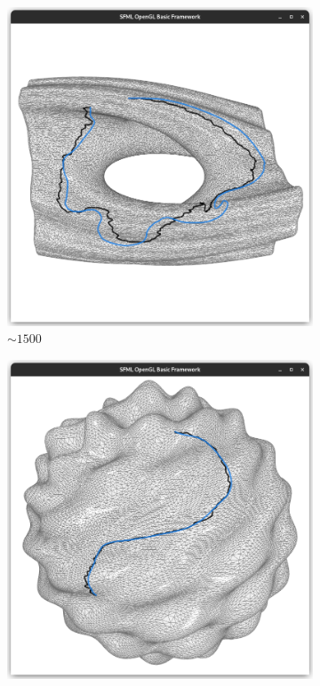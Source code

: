 \documentclass{stdlocal}
\begin{document}
\begin{figure}
  \begin{subfigure}[b]{0.24\linewidth}
    \centering
    \includegraphics[width=\linewidth,trim={15px 20 15 50},clip]{images/julia-smooth-1.png}
    \caption{$\sim 1500$}
  \end{subfigure}
  \begin{subfigure}[b]{0.24\linewidth}
    \centering
    \includegraphics[width=\linewidth,trim={15px 20 15 50},clip]{images/harmonic-smooth-1.png}

\end{subfigure}
\end{figure}
\end{document}
